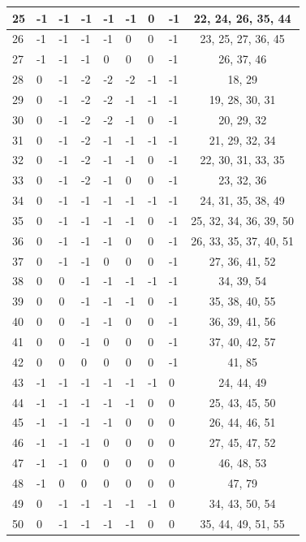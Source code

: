 \begin{longtable}{|l|l|l|l|l|l|l|l|c|}
25 & -1 & -1 & -1 & -1 & -1 & 0 & -1 & 22, 24, 26, 35, 44 \\ \hline
26 & -1 & -1 & -1 & -1 & 0 & 0 & -1 & 23, 25, 27, 36, 45 \\ \hline
27 & -1 & -1 & -1 & 0 & 0 & 0 & -1 & 26, 37, 46 \\ \hline
28 & 0 & -1 & -2 & -2 & -2 & -1 & -1 & 18, 29 \\ \hline
29 & 0 & -1 & -2 & -2 & -1 & -1 & -1 & 19, 28, 30, 31 \\ \hline
30 & 0 & -1 & -2 & -2 & -1 & 0 & -1 & 20, 29, 32 \\ \hline
31 & 0 & -1 & -2 & -1 & -1 & -1 & -1 & 21, 29, 32, 34 \\ \hline
32 & 0 & -1 & -2 & -1 & -1 & 0 & -1 & 22, 30, 31, 33, 35 \\ \hline
33 & 0 & -1 & -2 & -1 & 0 & 0 & -1 & 23, 32, 36 \\ \hline
34 & 0 & -1 & -1 & -1 & -1 & -1 & -1 & 24, 31, 35, 38, 49 \\ \hline
35 & 0 & -1 & -1 & -1 & -1 & 0 & -1 & 25, 32, 34, 36, 39, 50 \\ \hline
36 & 0 & -1 & -1 & -1 & 0 & 0 & -1 & 26, 33, 35, 37, 40, 51 \\ \hline
37 & 0 & -1 & -1 & 0 & 0 & 0 & -1 & 27, 36, 41, 52 \\ \hline
38 & 0 & 0 & -1 & -1 & -1 & -1 & -1 & 34, 39, 54 \\ \hline
39 & 0 & 0 & -1 & -1 & -1 & 0 & -1 & 35, 38, 40, 55 \\ \hline
40 & 0 & 0 & -1 & -1 & 0 & 0 & -1 & 36, 39, 41, 56 \\ \hline
41 & 0 & 0 & -1 & 0 & 0 & 0 & -1 & 37, 40, 42, 57 \\ \hline
42 & 0 & 0 & 0 & 0 & 0 & 0 & -1 & 41, 85 \\ \hline
43 & -1 & -1 & -1 & -1 & -1 & -1 & 0 & 24, 44, 49 \\ \hline
44 & -1 & -1 & -1 & -1 & -1 & 0 & 0 & 25, 43, 45, 50 \\ \hline
45 & -1 & -1 & -1 & -1 & 0 & 0 & 0 & 26, 44, 46, 51 \\ \hline
46 & -1 & -1 & -1 & 0 & 0 & 0 & 0 & 27, 45, 47, 52 \\ \hline
47 & -1 & -1 & 0 & 0 & 0 & 0 & 0 & 46, 48, 53 \\ \hline
48 & -1 & 0 & 0 & 0 & 0 & 0 & 0 & 47, 79 \\ \hline
49 & 0 & -1 & -1 & -1 & -1 & -1 & 0 & 34, 43, 50, 54 \\ \hline
50 & 0 & -1 & -1 & -1 & -1 & 0 & 0 & 35, 44, 49, 51, 55 \\ \hline

\end{longtable}
